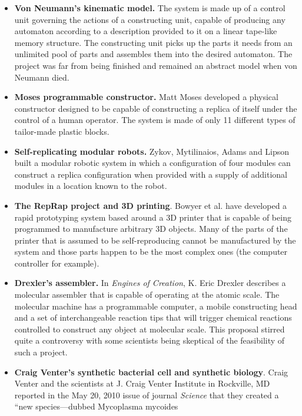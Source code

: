 \begin{itemize}
\item \textbf{Von Neumann’s kinematic model.} The system is made up of a
control unit governing the actions of a constructing unit, capable of
producing any automaton according to a description provided to it on a
linear tape-like memory structure. The constructing unit picks up the
parts it needs from an unlimited pool of parts and assembles them into
the desired automaton. The project was far from being finished and
remained an abstract model when von Neumann died.
\item \textbf{Moses{\textquotesingle} programmable constructor.} Matt Moses developed a physical constructor designed to be
capable of constructing a replica of itself under the control of a
human operator. The system is made of only 11 different types of
tailor-made plastic blocks.\citep{moses2001}
\item \textbf{Self-replicating modular robots.} Zykov, Mytilinaios,
Adams and Lipson built a modular robotic system in which a
configuration of four modules can construct a replica configuration
when provided with a supply of additional modules in a location known
to the robot.\citep{zykovetal2005}
\item \textbf{The RepRap project and 3D printing}. Bowyer et al.  have
developed a rapid prototyping system based around a 3D printer that is
capable of being programmed to manufacture arbitrary 3D objects. Many
of the parts of the printer that is assumed to be self-reproducing
cannot be manufactured by the system and those parts happen to be the
most complex ones (the computer controller for example).\citep{bowyer2007}
\item \textbf{Drexler’s assembler.} In \textit{Engines of Creation}, K. Eric
Drexler describes a molecular assembler that is capable of operating at
the atomic scale. The molecular machine has a programmable computer, a
mobile constructing head and a set of interchangeable reaction tips
that will trigger chemical reactions controlled to construct any object
at molecular scale.  \citep{drexler1986}
This proposal stirred quite a controversy with some
scientists being skeptical of the feasibility of such a project.\citep{smalley2001}
\item \textbf{Craig Venter’s synthetic bacterial cell and synthetic
biology}. Craig Venter and the scientists at
J. Craig Venter Institute in Rockville, MD
reported in the May 20, 2010 issue of journal
\textit{Science}
that they created a “new species---dubbed Mycoplasma mycoides

\end{itemize}
